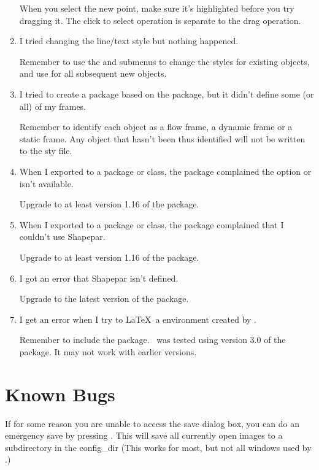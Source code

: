 \begin{enumerate}
When you select the new point, make sure it's highlighted before you
try dragging it. The click to select operation is separate to the
drag operation.

\item I tried changing the line/text style but nothing
happened.

Remember to use the  and 
submenus to change the styles for existing objects,
and use  for all subsequent new
objects.

\item I tried to create a package based on the 
package, but it didn't define some (or all) of my frames.

Remember to identify each \gls{object} as a flow frame,
a dynamic frame or a static frame. Any \gls{object}
that hasn't been thus identified will not be written to
the sty file.

\item When I exported to a package or class, the 
package complained the option  or  isn't available.

Upgrade to at least version 1.16 of the 
package.

\item When I exported to a package or class, the 
package complained that I couldn't use \gls{Shapepar}.

Upgrade to at least version 1.16 of the 
package.

\item I got an error that \gls{Shapepar} isn't defined.

Upgrade to the latest version of the  package.

\item I get an error when I try to \LaTeX\ a  environment created by \FlowframTk.

Remember to include the  package. \FlowframTk\ was
tested using version 3.0 of the  package.
It may not work with earlier versions.

\end{enumerate}

\section{Known Bugs}\label{sec:knownbugs}

If for some reason you are unable to access the save dialog box, you
can do an emergency save by pressing
. This will save all
currently open images to a subdirectory in the
\gls{config_dir} (This works for most, but not all windows used by \FlowframTk.)

